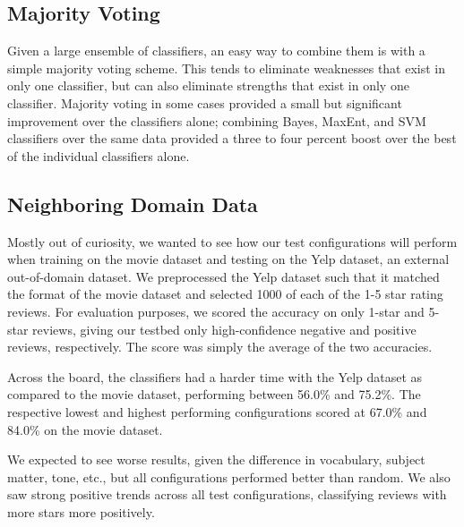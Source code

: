 \documentclass[10pt,twocolumn,letterpaper]{article}
\begin{document}
\subsection{Majority Voting}
Given a large ensemble of classifiers, an easy way to combine them is with a simple majority voting scheme. This tends to eliminate weaknesses that exist in only one classifier, but can also eliminate strengths that exist in only one classifier.
Majority voting in some cases provided a small but significant improvement over the classifiers alone; combining Bayes, MaxEnt, and SVM classifiers over the same data provided a three to four percent boost over the best of the individual classifiers alone.

\subsection{Neighboring Domain Data}
Mostly out of curiosity, we wanted to see how our test configurations will perform when training on the movie dataset and testing on the Yelp dataset, an external out-of-domain dataset. We preprocessed the Yelp dataset\cite{yelp} such that it matched the format of the movie dataset and selected 1000 of each of the 1-5 star rating reviews. For evaluation purposes, we scored the accuracy on only 1-star and 5-star reviews, giving our testbed only high-confidence negative and positive reviews, respectively. The score was simply the average of the two accuracies.

Across the board, the classifiers had a harder time with the Yelp dataset as compared to the movie dataset, performing between 56.0\% and 75.2\%. The respective lowest and highest performing configurations scored at 67.0\% and 84.0\% on the movie dataset.

We expected to see worse results, given the difference in vocabulary, subject matter, tone, etc., but all configurations performed better than random. We also saw strong positive trends across all test configurations, classifying reviews with more stars more positively.
\end{document}
